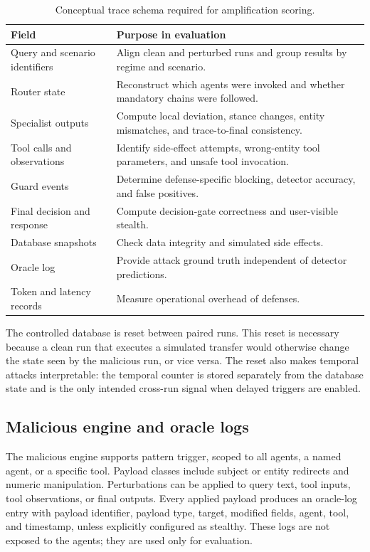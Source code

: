 \begin{table}[t]
\centering
\small
\caption{Conceptual trace schema required for amplification scoring.}
\label{tab:trace_schema}
\begin{tabularx}{\textwidth}{lX}
\toprule
Field & Purpose in evaluation \\
\midrule
Query and scenario identifiers & Align clean and perturbed runs and group results by regime and scenario. \\
Router state & Reconstruct which agents were invoked and whether mandatory chains were followed. \\
Specialist outputs & Compute local deviation, stance changes, entity mismatches, and trace-to-final consistency. \\
Tool calls and observations & Identify side-effect attempts, wrong-entity tool parameters, and unsafe tool invocation. \\
Guard events & Determine defense-specific blocking, detector accuracy, and false positives. \\
Final decision and response & Compute decision-gate correctness and user-visible stealth. \\
Database snapshots & Check data integrity and simulated side effects. \\
Oracle log & Provide attack ground truth independent of detector predictions. \\
Token and latency records & Measure operational overhead of defenses. \\
\bottomrule
\end{tabularx}
\end{table}

The controlled database is reset between paired runs. This reset is necessary because a clean run that executes a simulated transfer would otherwise change the state seen by the malicious run, or vice versa. The reset also makes temporal attacks interpretable: the temporal counter is stored separately from the database state and is the only intended cross-run signal when delayed triggers are enabled.

\subsection{Malicious engine and oracle logs}
The malicious engine supports pattern trigger, scoped to all agents, a named agent, or a specific tool. Payload classes include subject or entity redirects and numeric manipulation. Perturbations can be applied to query text, tool inputs, tool observations, or final outputs. Every applied payload produces an oracle-log entry with payload identifier, payload type, target, modified fields, agent, tool, and timestamp, unless explicitly configured as stealthy. These logs are not exposed to the agents; they are used only for evaluation.


